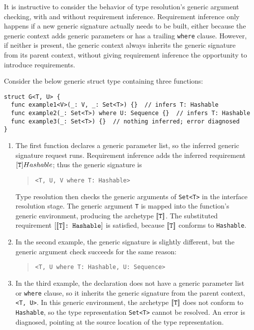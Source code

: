 \documentclass[../generics]{subfiles}
\begin{document}
\begin{example}
It is instructive to consider the behavior of type resolution's generic argument checking, with and without requirement inference. Requirement inference only happens if a new generic signature actually needs to be built, either because the generic context adds generic parameters or has a trailing \texttt{where} clause. However, if neither is present, the generic context always inherits the generic signature from its parent context, without giving requirement inference the opportunity to introduce requirements.

Consider the below generic struct type containing three functions:
\begin{Verbatim}
struct G<T, U> {
  func example1<V>(_: V, _: Set<T>) {}  // infers T: Hashable
  func example2(_: Set<T>) where U: Sequence {}  // infers T: Hashable
  func example3(_: Set<T>) {}  // nothing inferred; error diagnosed
}
\end{Verbatim}
\begin{enumerate}
\item The first function declares a generic parameter list, so the inferred generic signature request runs. Requirement inference adds the inferred requirement $[\texttt{T}]{Hashable}$; thus the generic signature is
\begin{quote}
\begin{verbatim}
<T, U, V where T: Hashable>
\end{verbatim}
\end{quote}
Type resolution then checks the generic arguments of \texttt{Set<T>} in the interface resolution stage. The generic argument \texttt{T} is mapped into the function's generic environment, producing the archetype $[\![\texttt{T}]\!]$. The substituted requirement $[[\![\texttt{T}]\!]\texttt{:~Hashable}]$ is satisfied, because $[\![\texttt{T}]\!]$ conforms to \texttt{Hashable}.

\item In the second example, the generic signature is slightly different, but the generic argument check succeeds for the same reason:
\begin{quote}
\begin{verbatim}
<T, U where T: Hashable, U: Sequence>
\end{verbatim}
\end{quote}

\item In the third example, the declaration does not have a generic parameter list or \texttt{where} clause, so it inherits the generic signature from the parent context, \texttt{<T, U>}. In this generic environment, the archetype $[\![\texttt{T}]\!]$ does not conform to \texttt{Hashable}, so the type representation \texttt{Set<T>} cannot be resolved. An error is diagnosed, pointing at the source location of the type representation.
\end{enumerate}
\end{example}
\end{document}
